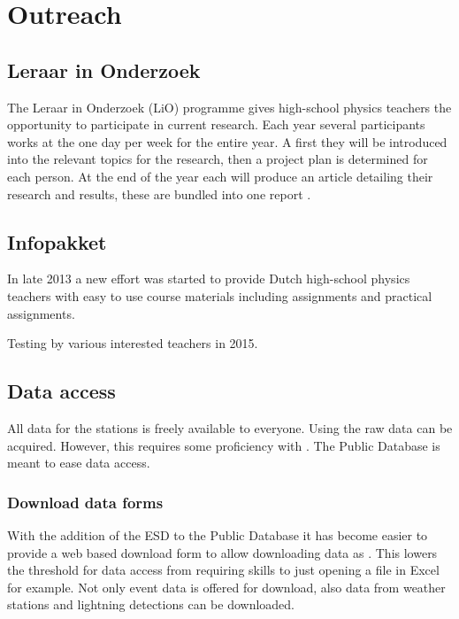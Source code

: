 \chapter{Outreach}
\label{ch:outreach}

\section{Leraar in Onderzoek}

The Leraar in Onderzoek (LiO) programme gives high-school physics
teachers the opportunity to participate in current research. Each year
several participants works at the \nikhef one day per week for the
entire year. A first they will be introduced into the relevant topics
for the research, then a project plan is determined for each person. At
the end of the year each will produce an article detailing their
research and results, these are bundled into one report
\cite{lio2009, lio2010, lio2011, lio2012}.


\section{Infopakket}

In late 2013 a new effort was started to provide Dutch high-school
physics teachers with easy to use course materials including assignments
and practical assignments.

Testing by various interested teachers in 2015.


\section{Data access}

All data for the \hisparc stations is freely available to everyone.
Using \sapphire the raw data can be acquired. However, this requires
some proficiency with \python. The Public Database is meant to ease data
access.


\subsection{Download data forms}

With the addition of the ESD to the Public Database it has become easier to provide a web based download form to allow downloading data as \tsv. This lowers the threshold for data access from requiring \python skills to just opening a \tsv file in Excel for example. Not only \hisparc event data is offered for download, also data from \hisparc weather stations and \knmi lightning detections can be downloaded.


